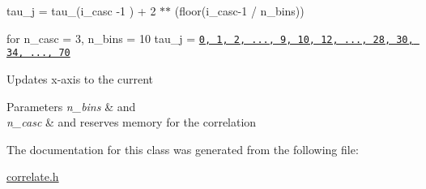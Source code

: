 tau\+\_\+j = tau\+\_\+(i\+\_\+casc -\/1 ) + 2 $\ast$$\ast$ (floor(i\+\_\+casc-\/1 / n\+\_\+bins))

for n\+\_\+casc = 3, n\+\_\+bins = 10 tau\+\_\+j = \href{j=0...n_casc*n_bins}{\tt 0, 1, 2, ..., 9, 10, 12, ..., 28, 30, 34, ..., 70}

Updates x-\/axis to the current 
\begin{DoxyParams}{Parameters}
{\em n\+\_\+bins} & and \\
\hline
{\em n\+\_\+casc} & and reserves memory for the correlation \\
\hline
\end{DoxyParams}


The documentation for this class was generated from the following file\+:\begin{DoxyCompactItemize}
\item 
\hyperlink{correlate_8h}{correlate.\+h}\end{DoxyCompactItemize}
